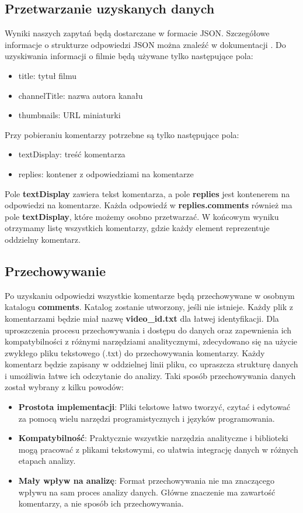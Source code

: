 	\subsection{Przetwarzanie uzyskanych danych}
		Wyniki naszych zapytań będą dostarczane w formacie JSON. Szczegółowe informacje o strukturze odpowiedzi JSON można znaleźć w dokumentacji \cite{YouTubeAPI}. Do uzyskiwania informacji o filmie będą używane tylko następujące pola:
		\begin{itemize}
			\item title: tytuł filmu
			\item channelTitle: nazwa autora kanału
			\item thumbnails: URL miniaturki
		\end{itemize}				
		 Przy pobieraniu komentarzy potrzebne są tylko następujące pola:
		 \begin{itemize}
		 	\item textDisplay: treść komentarza
		 	\item replies: kontener z odpowiedziami na komentarze
		 \end{itemize}
 		 Pole \textbf{textDisplay} zawiera tekst komentarza, a pole \textbf{replies} jest kontenerem na odpowiedzi na komentarze. Każda odpowiedź w \textbf{replies.comments} również ma pole \textbf{textDisplay}, które możemy osobno przetwarzać. W końcowym wyniku otrzymamy listę wszystkich komentarzy, gdzie każdy element reprezentuje oddzielny komentarz.
		
	\subsection{Przechowywanie}
		Po uzyskaniu odpowiedzi wszystkie komentarze będą przechowywane w osobnym katalogu \textbf{comments}. Katalog zostanie utworzony, jeśli nie istnieje. Każdy plik z komentarzami będzie miał nazwę \textbf{video\_id.txt} dla łatwej identyfikacji.
		Dla uproszczenia procesu przechowywania i dostępu do danych oraz zapewnienia ich kompatybilności z różnymi narzędziami analitycznymi, zdecydowano się na użycie zwykłego pliku tekstowego (.txt) do przechowywania komentarzy. Każdy komentarz będzie zapisany w oddzielnej linii pliku, co upraszcza strukturę danych i umożliwia łatwe ich odczytanie do analizy.
		Taki sposób przechowywania danych został wybrany z kilku powodów:
	\begin{itemize}
		\item \textbf{Prostota implementacji}: Pliki tekstowe łatwo tworzyć, czytać i edytować za pomocą wielu narzędzi programistycznych i języków programowania.
		\item \textbf{Kompatybilność}: Praktycznie wszystkie narzędzia analityczne i biblioteki mogą pracować z plikami tekstowymi, co ułatwia integrację danych w różnych etapach analizy.
		\item \textbf{Mały wpływ na analizę}: Format przechowywania nie ma znaczącego wpływu na sam proces analizy danych. Główne znaczenie ma zawartość komentarzy, a nie sposób ich przechowywania.
	\end{itemize}

